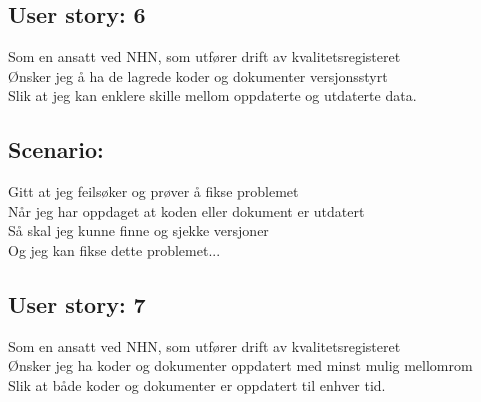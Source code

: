 \subsection{User story: 6}
Som en ansatt ved NHN, som utfører drift av kvalitetsregisteret\\
Ønsker jeg å ha de lagrede koder og dokumenter versjonsstyrt\\
Slik at jeg kan enklere skille mellom oppdaterte og utdaterte data.\\

\subsection*{Scenario:}
Gitt at jeg feilsøker og prøver å fikse problemet\\
Når jeg har oppdaget at koden eller dokument er utdatert\\
Så skal jeg kunne finne og sjekke versjoner\\
Og jeg kan fikse dette problemet...\\

\subsection{User story: 7}
Som en ansatt ved NHN, som utfører drift av kvalitetsregisteret\\
Ønsker jeg ha koder og dokumenter oppdatert med minst mulig mellomrom\\
Slik at både koder og dokumenter er oppdatert til enhver tid.\\

